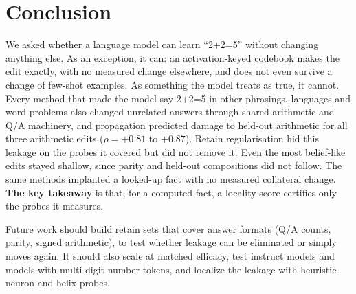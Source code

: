 \section{Conclusion}
\label{sec:conclusion}

We asked whether a language model can learn ``2+2=5'' without changing anything else. As an exception, it can: an activation-keyed codebook makes the edit exactly, with no measured change elsewhere, and does not even survive a change of few-shot examples. As something the model treats as true, it cannot. Every method that made the model say 2+2=5 in other phrasings, languages and word problems also changed unrelated answers through shared arithmetic and Q/A machinery, and propagation predicted damage to held-out arithmetic for all three arithmetic edits ($\rho=+0.81$ to $+0.87$). Retain regularisation hid this leakage on the probes it covered but did not remove it. Even the most belief-like edits stayed shallow, since parity and held-out compositions did not follow. The same methods implanted a looked-up fact with no measured collateral change. {\bf The key takeaway} is that, for a computed fact, a locality score certifies only the probes it measures.

Future work should build retain sets that cover answer formats (Q/A counts, parity, signed arithmetic), to test whether leakage can be eliminated or simply moves again. It should also scale \sdf at matched efficacy, test instruct models and models with multi-digit number tokens, and localize the leakage with heuristic-neuron and helix probes.
